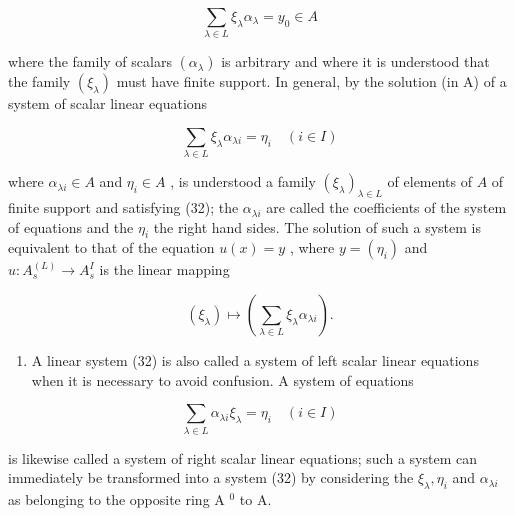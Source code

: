 \[
\sum_ {\lambda \in L} \xi_ {\lambda} \alpha_ {\lambda} = y _ {0} \in A\tag{31}
\]

where the family of scalars \((\alpha_{\lambda})\) is arbitrary and where it is understood that the family \((\xi_{\lambda})\) must have finite support. In general, by the solution (in A) of a system of scalar linear equations

\[
\sum_ {\lambda \in L} \xi_ {\lambda} \alpha_ {\lambda i} = \eta_ {i} \quad (i \in I)\tag{32}
\]

where \(\alpha_{\lambda i} \in A\) and \(\eta_i \in A\) , is understood a family \((\xi_\lambda)_{\lambda \in L}\) of elements of \(A\) of finite support and satisfying (32); the \(\alpha_{\lambda i}\) are called the coefficients of the system of equations and the \(\eta_i\) the right hand sides. The solution of such a system is equivalent to that of the equation \(u(x) = y\) , where \(y = (\eta_i)\) and \(u: A_s^{(L)} \to A_s^I\) is the linear mapping

\[
\left(\xi_ {\lambda}\right) \mapsto \left(\sum_ {\lambda \in L} \xi_ {\lambda} \alpha_ {\lambda i}\right).
\]

\begin{enumerate}
\def\labelenumi{(\arabic{enumi})}
\setcounter{enumi}{3}
\tightlist
\item
  A linear system (32) is also called a system of left scalar linear equations when it is necessary to avoid confusion. A system of equations
\end{enumerate}

\[
\sum_ {\lambda \in L} \alpha_ {\lambda i} \xi_ {\lambda} = \eta_ {i} \quad (i \in I)\tag{33}
\]

is likewise called a system of right scalar linear equations; such a system can immediately be transformed into a system (32) by considering the \(\xi_{\lambda}, \eta_{i}\) and \(\alpha_{\lambda i}\) as belonging to the opposite ring A \(^{0}\) to A.

